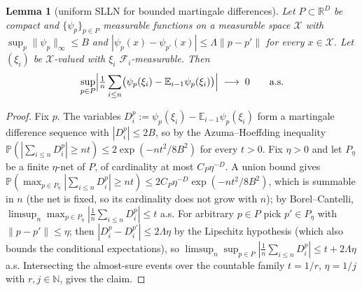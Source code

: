 \documentclass[10pt]{article}
\theoremstyle{plain}
\newtheorem{lemma}[theorem]{Lemma}
\theoremstyle{definition}
\begin{document}
\begin{lemma}[uniform SLLN for bounded martingale differences]\label{lem:uslln}
Let $P\subset\mathbb{R}^{D}$ be compact and $\{\psi_p\}_{p\in P}$ measurable functions on a measurable space $\mathcal{X}$ with $\sup_{p}\|\psi_p\|_\infty\le B$ and $|\psi_p(x)-\psi_{p'}(x)|\le\Lambda\|p-p'\|$ for every $x\in\mathcal{X}$. Let $(\xi_i)$ be $\mathcal{X}$-valued with $\xi_i$ $\mathcal{F}_i$-measurable. Then
\[
\sup_{p\in P}\Bigl|\tfrac1n\sum_{i\le n}\bigl(\psi_p(\xi_i)-\mathbb{E}_{i-1}\psi_p(\xi_i)\bigr)\Bigr|\;\longrightarrow\;0
\qquad\text{a.s.}
\]
\end{lemma}
\begin{proof}
Fix $p$. The variables $D^p_i:=\psi_p(\xi_i)-\mathbb{E}_{i-1}\psi_p(\xi_i)$ form a martingale difference sequence with $|D^p_i|\le2B$, so by the Azuma--Hoeffding inequality $\mathbb{P}(|\sum_{i\le n}D^p_i|\ge nt)\le2\exp(-nt^2/8B^2)$ for every $t>0$. Fix $\eta>0$ and let $P_\eta$ be a finite $\eta$-net of $P$, of cardinality at most $C_P\eta^{-D}$. A union bound gives $\mathbb{P}(\max_{p\in P_\eta}|\sum_{i\le n}D^p_i|\ge nt)\le2C_P\eta^{-D}\exp(-nt^2/8B^2)$, which is summable in $n$ (the net is fixed, so its cardinality does not grow with $n$); by Borel--Cantelli, $\limsup_n\max_{p\in P_\eta}|\tfrac1n\sum_{i\le n}D^p_i|\le t$ a.s. For arbitrary $p\in P$ pick $p'\in P_\eta$ with $\|p-p'\|\le\eta$; then $|D^p_i-D^{p'}_i|\le2\Lambda\eta$ by the Lipschitz hypothesis (which also bounds the conditional expectations), so $\limsup_n\sup_{p\in P}|\tfrac1n\sum_{i\le n}D^p_i|\le t+2\Lambda\eta$ a.s. Intersecting the almost-sure events over the countable family $t=1/r$, $\eta=1/j$ with $r,j\in\mathbb{N}$, gives the claim.
\end{proof}
\end{document}
